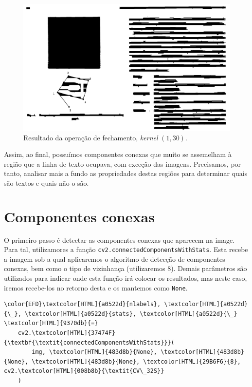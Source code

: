 \documentclass[twocolumn, 10pt]{article}
\begin{document}
\begin{figure}[htbp]
\centering
\includegraphics[width=.9\linewidth]{./img/step6.png}
\caption{Resultado da operação de fechamento, \emph{kernel} \((1,30)\).}
\end{figure}

Assim, ao final, possuímos componentes conexas que muito se assemelham à região que a linha de texto ocupava, com exceção das imagens.
Precisamos, por tanto, analisar mais a fundo as propriedades destas regiões para determinar quais são textos e quais não o são.

\section*{Componentes conexas}
\label{sec:orgc1976ad}
O primeiro passo é detectar as componentes conexas que aparecem na image.
Para tal, utilizamores a função \texttt{cv2.connectedComponentsWithStats}.
Esta recebe a imagem sob a qual aplicaremos o algoritmo de detecção de componentes conexas, bem como o tipo de vizinhança (utilizaremos \(8\)).
Demais parâmetros são utilizados para indicar onde esta função irá colocar os resultados, mas neste caso, iremos recebe-los no retorno desta e os mantemos como \texttt{None}.
\begin{Code}
\begin{Verbatim}
\color{EFD}\textcolor[HTML]{a0522d}{nlabels}, \textcolor[HTML]{a0522d}{\_}, \textcolor[HTML]{a0522d}{stats}, \textcolor[HTML]{a0522d}{\_} \textcolor[HTML]{9370db}{=}
    cv2.\textcolor[HTML]{37474F}{\textbf{\textit{connectedComponentsWithStats}}}(
        img, \textcolor[HTML]{483d8b}{None}, \textcolor[HTML]{483d8b}{None}, \textcolor[HTML]{483d8b}{None}, \textcolor[HTML]{29B6F6}{8}, cv2.\textcolor[HTML]{008b8b}{\textit{CV\_32S}}
    )
\end{Verbatim}
\end{Code}
\end{document}

